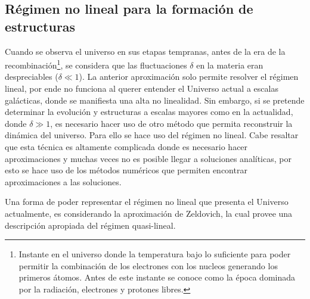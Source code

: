 \subsection{Régimen no lineal para la formación de estructuras}
\label{subsec:non-Lineal_Estructure_Formation}

Cuando se observa el universo en sus etapas tempranas, antes de la era de la recombinación\footnote{Instante en el universo donde la temperatura bajo lo suficiente para poder permitir la combinación de los electrones con los nucleos generando los primeros átomos. Antes de este instante se conoce como la época dominada por la radiación, electrones y protones libres.}, se considera que las fluctuaciones $\delta$  en la materia eran despreciables ($\delta \ll 1$). La anterior aproximación solo permite resolver el régimen lineal, por ende no funciona al querer entender el Universo actual a escalas galácticas, donde se manifiesta una alta no linealidad.  Sin embargo, si se pretende determinar la evolución y estructuras a escalas mayores como en la actualidad, donde $\delta \gg 1$, es necesario hacer uso de otro método que permita reconstruir la dinámica del universo. Para ello se hace uso del régimen no lineal. Cabe resaltar que esta técnica es altamente complicada donde es necesario hacer aproximaciones y muchas veces no es posible llegar a soluciones analíticas, por esto se hace uso de los métodos numéricos que permiten encontrar aproximaciones a las soluciones. 

Una forma de poder representar el régimen no lineal que presenta el Universo actualmente, es considerando la aproximación de Zeldovich, la cual provee una descripción apropiada del régimen quasi-lineal. 



